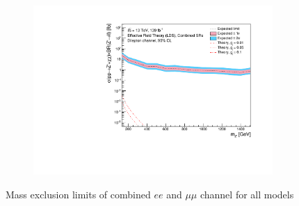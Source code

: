 \documentclass[12pt, a4paper]{book}
\begin{document}
\begin{figure}[!ht]
\begin{subfigure}[b]{0.49\textwidth}
   \end{subfigure}
   \hfill
   \begin{subfigure}[b]{0.49\textwidth}
      \centering
      \includegraphics[width=1\textwidth]{Limits/Model_independent/EFT_LDS/mass_exclusion_comb.pdf}
   \end{subfigure}
   \caption[Mass exclusion limits of combined $ee$ and $\mu\mu$ channel for all models]{Mass exclusion limits of combined $ee$ and $\mu\mu$ channel for all models}\label{fig:model_indep_exclusions}
\end{figure}
\clearpage
\end{document}
